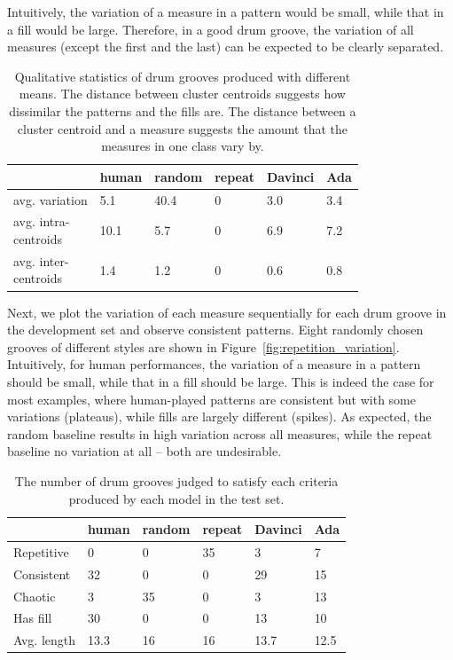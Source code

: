 \documentclass[letterpaper]{article} %
\begin{document}
Intuitively, the variation of a measure in a pattern would be small, while that in a fill would be large. Therefore, in a good drum groove, the variation of all measures (except the first and the last) can be expected to be clearly separated.

\begin{table}[t!]
\small
\centering
\begin{tabular}{llllll}
\toprule
& human & random & repeat & Davinci & Ada \\ \midrule
avg. variation   &  5.1  &  40.4 & 0  & 3.0  &  3.4   \\
\makecell[l]{avg. intra- \\ centroids}   &  10.1  &  5.7 & 0  & 6.9  &  7.2   \\
\makecell[l]{avg. inter- \\ centroids}   &  1.4  &  1.2 & 0  & 0.6  &  0.8   \\
\bottomrule
\end{tabular}
\caption{Qualitative statistics of drum grooves produced with different means. The distance between cluster centroids
suggests how dissimilar the patterns and the fills are. The distance between a cluster centroid and a measure suggests the amount that the measures in one class vary by.}
\label{tab:variation}
\end{table}

Next, we plot the variation of each measure sequentially for each drum groove in the development set and observe consistent patterns. Eight randomly chosen grooves of different styles are shown in Figure~\ref{fig:repetition_variation}. Intuitively, for human performances, the variation of a measure in a pattern should be small, while that in a fill should be large. This is indeed the case for most examples, where human-played patterns are consistent but with some variations (plateaus), while fills are largely different (spikes). As expected, the random baseline results in high variation across all measures, while the repeat baseline no variation at all -- both are undesirable.

\begin{table}[t!]
\small
\centering
\begin{tabular}{llllll}
\toprule
& human & random & repeat & Davinci & Ada \\ \midrule
Repetitive   &  0  &  0 & 35  & 3  &  7   \\
Consistent   &  32  &  0 & 0  & 29  &  15   \\
Chaotic   &  3  &  35 & 0  & 3  &  13   \\
Has fill   &  30  &  0  & 0  &  13  &  10  \\
Avg. length   &  13.3  &   16  & 16  &  13.7  &  12.5  \\
\bottomrule
\end{tabular}
\caption{The number of drum grooves judged to satisfy each criteria produced by each model in the test set.}
\label{tab:subjective}
\end{table}
\end{document}
